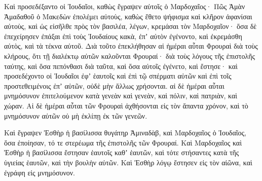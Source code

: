 {\par }{\PP {}Καὶ προσεδέξαντο οἱ Ἰουδαῖοι, καθὼς ἔγραψεν αὐτοῖς ὁ Μαρδοχαῖος·
Πῶς Ἀμὰν Ἀμαδαθοῦ ὁ Μακεδὼν ἐπολέμει αὐτοὺς, καθὼς ἔθετο ψήφισμα καὶ κλῆρον ἀφανίσαι αὐτοὺς,
καὶ ὡς εἰσῆλθε πρὸς τὸν βασιλέα, λέγων, κρεμάσαι τὸν Μαρδοχαῖον· ὅσα δὲ ἐπεχείρησεν ἐπάξαι ἐπὶ τοὺς Ἰουδαίους κακὰ, ἐπʼ αὐτὸν ἐγένοντο, καὶ ἐκρεμάσθη αὐτὸς, καὶ τὰ τέκνα αὐτοῦ.
Διὰ τοῦτο ἐπεκλήθησαν αἱ ἡμέραι αὗται Φρουραὶ διὰ τοὺς κλήρους, ὅτι τῇ διαλέκτῳ αὐτῶν καλοῦνται Φρουραί· διὰ τοὺς λόγους τῆς ἐπιστολῆς ταύτης, καὶ ὅσα πεπόνθασι διὰ ταῦτα, καὶ ὅσα αὐτοῖς ἐγένετο,
καὶ ἔστησε· καὶ προσεδέχοντο οἱ Ἰουδαῖοι ἐφʼ ἑαυτοῖς καὶ ἐπὶ τῷ σπέρματι αὐτῶν καὶ ἐπὶ τοῖς προστεθειμένοις ἐπʼ αὐτῶν, οὐδὲ μὴν ἄλλως χρήσονται. αἱ δὲ ἡμέραι αὗται μνημόσυνον ἐπιτελούμενον κατὰ γενεὰν καὶ γενεὰν, καὶ πόλιν, καὶ πατριὰν, καὶ χώραν.
Αἱ δὲ ἡμέραι αὗται τῶν Φρουραὶ ἀχθήσονται εἰς τὸν ἅπαντα χρόνον, καὶ τὸ μνημόσυνον αὐτῶν οὐ μὴ ἐκλίπῃ ἐκ τῶν γενεῶν.
\par }{\PP {}Καὶ ἔγραψεν Ἐσθὴρ ἡ βασίλισσα θυγάτηρ Ἀμιναδὰβ, καὶ Μαρδοχαῖος ὁ Ἰουδαῖος, ὅσα ἐποίησαν, τό τε στερέωμα τῆς ἐπιστολῆς τῶν Φρουραί.
Καὶ Μαρδοχαῖος καὶ Ἐσθὴρ ἡ βασίλισσα ἔστησαν ἑαυτοῖς καθʼ ἑαυτῶν, καὶ τότε στήσαντες κατὰ τῆς ὑγιείας ἑαυτῶν, καὶ τὴν βουλὴν αὐτῶν.
Καὶ Ἐσθὴρ λόγῳ ἔστησεν εἰς τὸν αἰῶνα, καὶ ἐγράφη εἰς μνημόσυνον.

}

